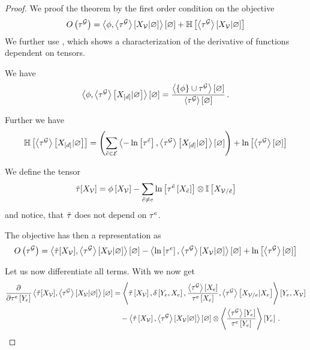 \begin{proof}%
    We proof the theorem by the first order condition on the objective
    \begin{align*}
        O\left(\tau^{\mathcal{G}}\right) = \left\langle \phi,\left\langle \tau^{\mathcal{G}}\right\rangle \left[ X_{\mathcal{V}} | \varnothing \right]\right\rangle \left[ \varnothing \right] + \mathbb{H}\left[\left\langle \tau^{\mathcal{G}}\right\rangle \left[ X_{\mathcal{V}} | \varnothing \right]\right]
    \end{align*}
    We further use , which shows a characterization of the derivative of functions dependent on tensors.

    We have %
    \begin{align*}
        \left\langle \phi,\left\langle \tau^{\mathcal{G}}\right\rangle \left[ X_{[d]} | \varnothing \right]\right\rangle \left[ \varnothing \right]
        =  \frac{
            \left\langle \{\phi\}\cup\tau^{\mathcal{G}}\right\rangle \left[ \varnothing \right]
        }{
            \left\langle \tau^{\mathcal{G}}\right\rangle \left[ \varnothing \right]
        } \, .
    \end{align*}

    Further we have
    \begin{align*}
        \mathbb{H}\left[\left\langle \tau^{\mathcal{G}}\right\rangle \left[ X_{[d]} | \varnothing \right]\right]
        = \left(\sum_{\tilde{e}\in\mathcal{E}} \left\langle -\ln \left[ \tau^{\tilde{e}} \right],\left\langle \tau^{\mathcal{G}}\right\rangle \left[ X_{[d]} | \varnothing \right]\right\rangle \left[ \varnothing \right] \right)
        + \ln \left[ \left\langle \tau^{\mathcal{G}}\right\rangle \left[ \varnothing \right] \right]
    \end{align*}

    We define the tensor
    \[ \tilde{\tau}[X_{\mathcal{V}}] = \phi\left[X_{\mathcal{V}}\right]
    - \sum_{\tilde{e}\neq e} \ln \left[ \tau^{\tilde{e}}\left[X_{\tilde{e}}\right] \right] \otimes \mathbb{I}\left[X_{\mathcal{V}/\tilde{e}}\right] \]
    and notice, that $\tilde{\tau}$ does not depend on $\tau^{e}$.

    The objective has then a representation as
    \begin{align*}
        O\left(\tau^{\mathcal{G}}\right) = \left\langle \tilde{\tau}[X_{\mathcal{V}}], \left\langle \tau^{\mathcal{G}}\right\rangle \left[ X_{\mathcal{V}} | \varnothing \right]\right\rangle \left[ \varnothing \right] - \left\langle  \ln \left[ \tau^{e} \right], \left\langle \tau^{\mathcal{G}}\right\rangle \left[ X_{\mathcal{V}} | \varnothing \right]\right\rangle \left[ \varnothing \right] +  \ln \left[ \left\langle \tau^{\mathcal{G}}\right\rangle \left[ \varnothing \right] \right]
    \end{align*}

    Let us now differentiate all terms.
    With  we now get
    \begin{align*}
        \frac{\partial }{\partial \tau^{e}\left[Y_{e}\right]} \left\langle \tilde{\tau}[X_{\mathcal{V}}], \left\langle \tau^{\mathcal{G}}\right\rangle \left[ X_{\mathcal{V}} | \varnothing \right]\right\rangle \left[ \varnothing \right]
        & = \left\langle \tilde{\tau}\left[X_{\mathcal{V}}\right],
            \delta\left[Y_{e},X_{e}\right],
            \frac{\left\langle \tau^{\mathcal{G}}\right\rangle \left[ X_{e} \right]}{\tau^{e}\left[X_{e}\right]},
            \left\langle \tau^{\mathcal{G}}\right\rangle \left[ X_{\mathcal{V}/e} | X_{e} \right] \right\rangle \left[ Y_{e},X_{\mathcal{V}} \right] \\
        & \quad -  \left\langle \tilde{\tau}\left[X_{\mathcal{V}}\right],\left\langle \tau^{\mathcal{G}}\right\rangle \left[ X_{\mathcal{V}} | \varnothing \right]\right\rangle \left[ \varnothing \right]
        \otimes \left\langle \frac{\left\langle \tau^{\mathcal{G}}\right\rangle \left[ Y_{e} \right]}{\tau^{e}\left[Y_{e}\right]}
        \right\rangle \left[ Y_{e} \right] \, .
    \end{align*}


\end{proof}
